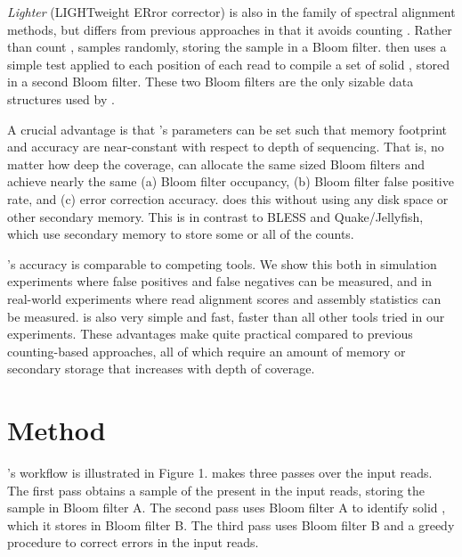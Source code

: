 \documentclass{bmcart}
\begin{document}
\emph{Lighter} (LIGHTweight ERror corrector) is also in the family of spectral alignment methods, but differs from previous approaches in that it avoids counting \kmers.
Rather than count \kmers, \tool samples \kmers randomly, storing the sample in a Bloom filter.
\tool then uses a simple test applied to each position of each read to compile a set of solid \kmers, stored in a second Bloom filter.
These two Bloom filters are the only sizable data structures used by \tool.

A crucial advantage is that \tool's parameters can be set such that memory footprint and accuracy are near-constant with respect to depth of sequencing.
That is, no matter how deep the coverage, \tool can allocate the same sized Bloom filters and achieve nearly the same (a) Bloom filter occupancy, (b) Bloom filter false positive rate, and (c) error correction accuracy.
\tool does this without using any disk space or other secondary memory.
This is in contrast to BLESS and Quake/Jellyfish, which use secondary memory to store some or all of the \kmer counts.

\tool's accuracy is comparable to competing tools.  We show this both in simulation experiments where false positives and false negatives can be measured, and in real-world experiments where read alignment scores and assembly statistics can be measured.  
\tool is also very simple and fast, faster than all other tools tried in our experiments.
These advantages make \tool quite practical compared to previous counting-based approaches, all of which require an amount of memory or secondary storage that increases with depth of coverage.

\section*{Method}
\tool's workflow is illustrated in Figure 1. \tool makes three passes over the input reads.  The first pass obtains a sample of the \kmers present in the input reads, storing the sample in Bloom filter A.  The second pass uses Bloom filter A to identify solid \kmers, which it stores in Bloom filter B.  The third pass uses Bloom filter B and a greedy procedure to correct errors in the input reads.
\end{document}
